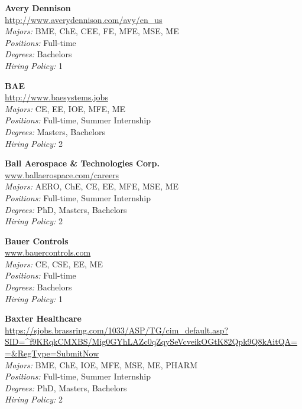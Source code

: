 \documentclass[twoside]{article}
\begin{document}
\begin{center}
\begin{multicols}{3}
\begin{minipage}{.9\columnwidth}{\Large\bf Avery Dennison }\\
	\url{http://www.averydennison.com/avy/en_us}\\
	\emph{Majors:} BME, ChE, CEE, FE, MFE, MSE, ME\\
	\emph{Positions:} Full-time\\
	\emph{Degrees:} Bachelors\\
	\emph{Hiring Policy:} 1\\
\end{minipage}
 
\begin{minipage}{.9\columnwidth}{\Large\bf BAE }\\
	\url{http://www.baesystems.jobs}\\
	\emph{Majors:} CE, EE, IOE, MFE, ME\\
	\emph{Positions:} Full-time, Summer Internship\\
	\emph{Degrees:} Masters, Bachelors\\
	\emph{Hiring Policy:} 2\\
\end{minipage}
 
\begin{minipage}{.9\columnwidth}{\Large\bf Ball Aerospace \& Technologies Corp. }\\
	\url{www.ballaerospace.com/careers}\\
	\emph{Majors:} AERO, ChE, CE, EE, MFE, MSE, ME\\
	\emph{Positions:} Full-time, Summer Internship\\
	\emph{Degrees:} PhD, Masters, Bachelors\\
	\emph{Hiring Policy:} 2\\
\end{minipage}
 
\begin{minipage}{.9\columnwidth}{\Large\bf Bauer Controls }\\
	\url{www.bauercontrols.com}\\
	\emph{Majors:} CE, CSE, EE, ME\\
	\emph{Positions:} Full-time\\
	\emph{Degrees:} Bachelors\\
	\emph{Hiring Policy:} 1\\
\end{minipage}
 
\begin{minipage}{.9\columnwidth}{\Large\bf Baxter Healthcare }\\
	\url{https://sjobs.brassring.com/1033/ASP/TG/cim_default.asp?SID=^f9KRqkCMXBS/Mig0GYhLAZc0qZqySeVcveikOGtK82Qpk9Q8kAitQA==&RegType=SubmitNow}\\
	\emph{Majors:} BME, ChE, IOE, MFE, MSE, ME, PHARM\\
	\emph{Positions:} Full-time, Summer Internship\\
	\emph{Degrees:} PhD, Masters, Bachelors\\
	\emph{Hiring Policy:} 2\\
\end{minipage}
 

\end{multicols}
\end{center}
\end{document}
